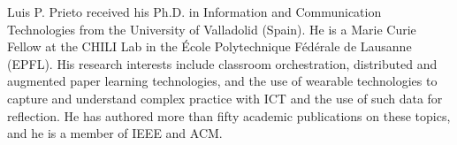 \documentclass[10pt,journal,compsoc]{IEEEtran}
\begin{document}
% 

%
%
%
%


\begin{IEEEbiography}{Luis P. Prieto} received his Ph.D. in Information and Communication Technologies from the University of Valladolid (Spain). He is a Marie Curie Fellow at the CHILI Lab in the \'Ecole Polytechnique F\'ed\'erale de Lausanne (EPFL). His research interests include classroom orchestration, distributed and augmented paper learning technologies, and the use of wearable technologies to capture and understand complex practice with ICT and the use of such data for reflection. He has authored more than fifty academic publications on these topics, and he is a member of IEEE and ACM.
\end{IEEEbiography}
\end{document}
